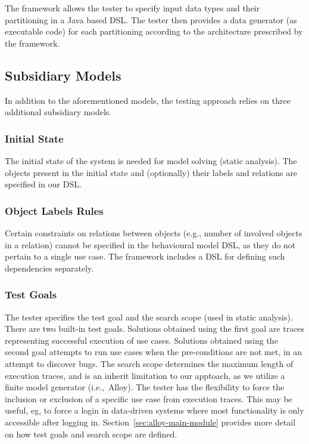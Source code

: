 The framework allows the tester to specify input data types and their partitioning in a Java based DSL. The tester then provides a data generator (as executable code) for each partitioning according to the architecture prescribed by the framework. 

\subsection{Subsidiary Models}
\label{sec:framework-overview-subsidiary}
In addition to the aforementioned models, the testing approach relies on three additional subsidiary models.

\subsubsection{Initial State} 
\label{sec:framework-overview-initial}
The initial state of the system is needed for model solving (static analysis). The objects present in the initial state and (optionally) their labels and relations are specified in our DSL.

\subsubsection{Object Labels Rules}
\label{sec:framework-overview-rules}
Certain constraints on relations between objects (e.g., number of involved objects in a relation) cannot be specified in the behavioural model DSL, as they do not pertain to a single use case. The framework includes a DSL for defining such dependencies  separately.

\subsubsection{Test Goals}
The tester specifies the test goal and the search scope (used in static analysis). There are two built-in test goals. Solutions obtained using the first goal are traces representing successful execution of use cases.
Solutions obtained using the second goal attempts to run use cases when the pre-conditions are not met, in an attempt to discover bugs.
The search scope determines the maximum length of execution traces, and is an inherit limitation to our apptoach, as we utilize a finite model generator (i.e.,\ Alloy).  The tester has the flexibility to force the inclusion or exclusion of a specific use case from execution traces. This may be useful, eg, to force a login in data-driven systems where most functionality is only accessible after logging in. Section~\ref{sec:alloy-main-module} provides more detail on how test goals and search scope are defined.


